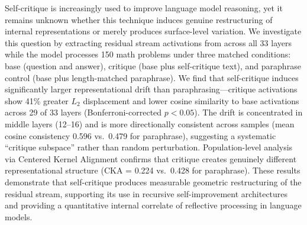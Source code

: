 Self-critique is increasingly used to improve language model reasoning, yet it remains unknown whether this technique induces genuine restructuring of internal representations or merely produces surface-level variation. We investigate this question by extracting residual stream activations from \pythia across all 33 layers while the model processes 150 \gsm math problems under three matched conditions: base (question and answer), critique (base plus self-critique text), and paraphrase control (base plus length-matched paraphrase). We find that self-critique induces significantly larger representational drift than paraphrasing---critique activations show 41\% greater $L_2$ displacement and lower cosine similarity to base activations across 29 of 33 layers (Bonferroni-corrected $p < 0.05$). The drift is concentrated in middle layers (12--16) and is more directionally consistent across samples (mean cosine consistency 0.596 vs.\ 0.479 for paraphrase), suggesting a systematic ``critique subspace'' rather than random perturbation. Population-level analysis via Centered Kernel Alignment confirms that critique creates genuinely different representational structure (CKA = 0.224 vs.\ 0.428 for paraphrase). These results demonstrate that self-critique produces measurable geometric restructuring of the residual stream, supporting its use in recursive self-improvement architectures and providing a quantitative internal correlate of reflective processing in language models.
